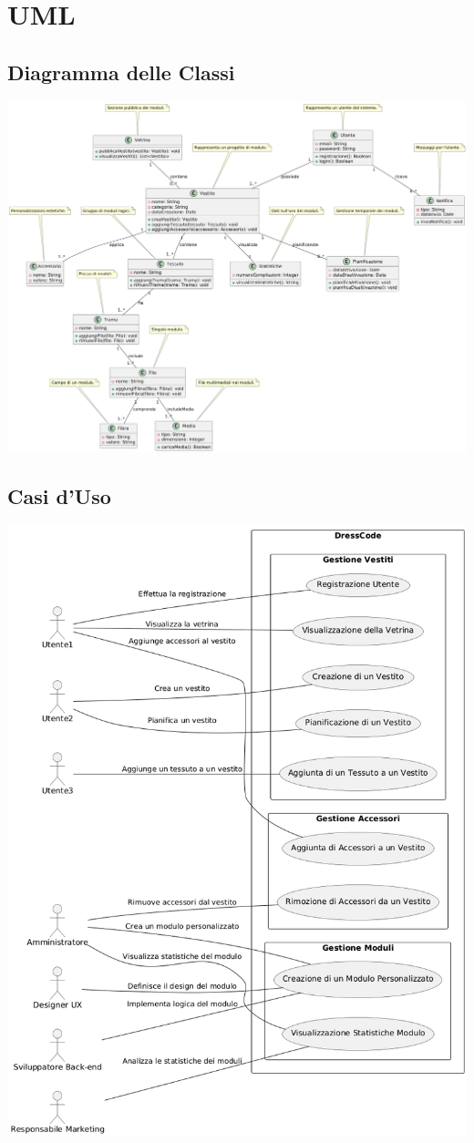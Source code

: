 \section{\huge UML}
\subsection{Diagramma delle Classi}
\begin{center}
    \includegraphics[width=1.3\linewidth,angle=-90]{uml/diagramma_delle_classi.png}
\end{center}
\subsection{Casi d'Uso}
\includegraphics[width=1\linewidth]{uml/casi_d_uso.png}